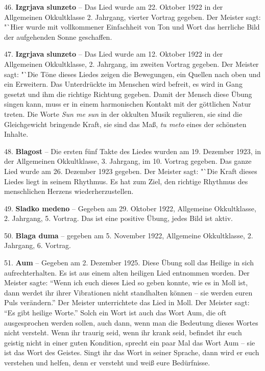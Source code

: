 \documentclass[11pt,a5paper,twoside]{article}
\begin{document}
46. \textbf{Izgrjava slunzeto} -- Das Lied wurde am 22. Oktober 1922 in der Allgemeinen Okkultklasse 2. Jahrgang, vierter Vortrag gegeben. Der Meister sagt: "`Hier wurde mit vollkommener Einfachheit von Ton und Wort das herrliche Bild der aufgehenden Sonne geschaffen.

47. \textbf{Izgrjava slunzeto} -- Das Lied wurde am 12. Oktober 1922 in der Allgemeinen Okkultklasse, 2. Jahrgang, im zweiten Vortrag gegeben. Der Meister sagt: "`Die Töne dieses Liedes zeigen die Bewegungen, ein Quellen nach oben und ein Erweitern. Das Unterdrückte im Menschen wird befreit, es wird in Gang gesetzt und ihm die richtige Richtung gegeben. Damit der Mensch diese Übung singen kann, muss er in einem harmonischen Kontakt mit der göttlichen Natur treten. Die Worte \textit{Sun me sun} in der okkulten Musik regulieren, sie sind die Gleichgewicht bringende Kraft, sie sind das Maß, \textit{tu meto} eines der schönsten Inhalte.

48. \textbf{Blagost} -- Die ersten fünf Takte des Liedes wurden am 19. Dezember 1923, in der Allgemeinen Okkultklasse, 3. Jahrgang, im 10. Vortrag gegeben. Das ganze Lied wurde am 26. Dezember 1923 gegeben. Der Meister sagt: "`Die Kraft dieses Liedes liegt in seinem Rhythmus. Es hat zum Ziel, den richtige Rhythmus des menschlichen Herzens wiederherzustellen.

49. \textbf{Sladko medeno} -- Gegeben am 29. Oktober 1922, Allgemeine Okkultklasse, 2. Jahrgang, 5. Vortrag. Das ist eine positive Übung, jedes Bild ist aktiv. 

50. \textbf{Blaga duma} -- gegeben am 5. November 1922, Allgemeine Okkultklasse, 2. Jahrgang, 6. Vortrag. 

51. \textbf{Aum} -- Gegeben am 2. Dezember 1925. Diese Übung soll das Heilige in sich aufrechterhalten. Es ist aus einem alten heiligen Lied entnommen worden. Der Meister sagte: "`Wenn ich euch dieses Lied so geben konnte, wie es in Moll ist, dann werdet ihr ihrer Vibrationen nicht standhalten können -- sie werden euren Puls verändern."' Der Meister unterrichtete das Lied in Moll. Der Meister sagt: "`Es gibt heilige Worte."' Solch ein Wort ist auch das Wort Aum, die oft ausgesprochen werden sollen, auch dann, wenn man die Bedeutung dieses Wortes nicht versteht. Wenn ihr traurig seid, wenn ihr krank seid, befindet ihr euch geistig nicht in einer guten Kondition, sprecht ein paar Mal das Wort Aum -- sie ist das Wort des Geistes. Singt ihr das Wort in seiner Sprache, dann wird er euch verstehen und helfen, denn er versteht und weiß eure Bedürfnisse. 
\end{document}
